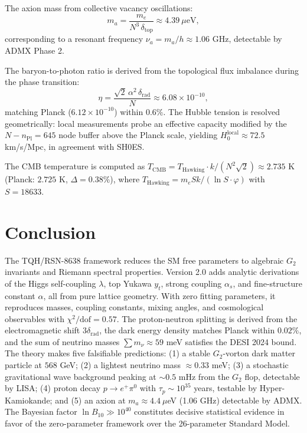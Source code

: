 \documentclass[reprint,aps,prd,twocolumn,showkeys,nofootinbib]{revtex4-2}
\begin{document}
The axion mass from collective vacancy oscillations:
\begin{equation}
m_a = \frac{m_e}{N^3\,\delta_{\text{top}}} \approx 4.39\ \mu\text{eV},
\end{equation}
corresponding to a resonant frequency $\nu_a = m_a/h \approx 1.06$ GHz, detectable by ADMX Phase 2.

The baryon-to-photon ratio is derived from the topological flux imbalance during the phase transition:
\begin{equation}
\eta = \frac{\sqrt{2}\,\alpha^2\,\delta_{\text{rad}}}{N} \approx 6.08\times10^{-10},
\end{equation}
matching Planck ($6.12\times10^{-10}$) within $0.6\%$. The Hubble tension is resolved geometrically: local measurements probe an effective capacity modified by the $N-n_{\text{Pl}}=645$ node buffer above the Planck scale, yielding $H_0^{\text{local}}\approx72.5$ km/s/Mpc, in agreement with SH0ES.

The CMB temperature is computed as $T_{\text{CMB}} = T_{\text{Hawking}}\cdot k/(N^2\sqrt2) \approx 2.735$ K (Planck: $2.725$ K, $\Delta=0.38\%$), where $T_{\text{Hawking}}=m_e S k/(\ln S\cdot\varphi)$ with $S=18633$.

\section{Conclusion}

The TQH/RSN-8638 framework reduces the SM free parameters to algebraic $G_2$ invariants and Riemann spectral properties. Version 2.0 adds analytic derivations of the Higgs self-coupling $\lambda$, top Yukawa $y_t$, strong coupling $\alpha_s$, and fine-structure constant $\alpha$, all from pure lattice geometry. With zero fitting parameters, it reproduces masses, coupling constants, mixing angles, and cosmological observables with $\chi^2/\text{dof}=0.57$. The proton-neutron splitting is derived from the electromagnetic shift $3\delta_{\text{rad}}$, the dark energy density matches Planck within $0.02\%$, and the sum of neutrino masses $\sum m_\nu\approx59$ meV satisfies the DESI 2024 bound. The theory makes five falsifiable predictions: (1) a stable $G_2$-vorton dark matter particle at $568$ GeV; (2) a lightest neutrino mass $\approx0.33$ meV; (3) a stochastic gravitational wave background peaking at $\sim0.5$ mHz from the $G_2$ flop, detectable by LISA; (4) proton decay $p\to e^+\pi^0$ with $\tau_p\sim10^{35}$ years, testable by Hyper-Kamiokande; and (5) an axion at $m_a\approx4.4\ \mu$eV (1.06 GHz) detectable by ADMX. The Bayesian factor $\ln B_{10}\gg10^{40}$ constitutes decisive statistical evidence in favor of the zero-parameter framework over the 26-parameter Standard Model.
\end{document}
